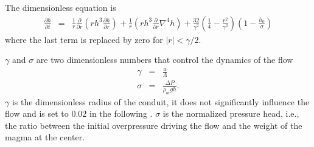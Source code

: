 The dimensionless equation is
\begin{eqnarray}
  \frac{\partial h}{\partial t}& =&\frac{1}{ r}
                                    \frac{\partial}{\partial r}  \left( rh^3  \frac{\partial h}{\partial
                                    r}\right)+\frac{1}{ r} \left( rh^3 \frac{\partial}{\partial r}\nabla^4h\right)+
                                    \frac{32}{\gamma^{2}}\left(\frac{1}{4}-\frac{r^{2}}{\gamma^{2}}\right)\left(1-\frac{h_0}{\sigma}\right)
\end{eqnarray}
where the last term is replaced by zero for $|r|<\gamma/2$.

$\gamma$ and $\sigma$  are two dimensionless numbers  that control the
dynamics of the flow
\begin{eqnarray}
  \gamma &=& \frac{a}{\Lambda}\\
  \sigma &=& \frac{\Delta P}{\rho_m g h}.
\end{eqnarray}
$\gamma$  is the  dimensionless radius  of  the conduit,  it does  not
significantly influence the flow and is set to $0.02$ in the following
\citep{Michaut:2009jx,Michaut:2011kg}.   $\sigma$  is  the  normalized
pressure  head,  i.e.,  the  ratio between  the  initial  overpressure
driving the flow and the weight of the magma at the center.


